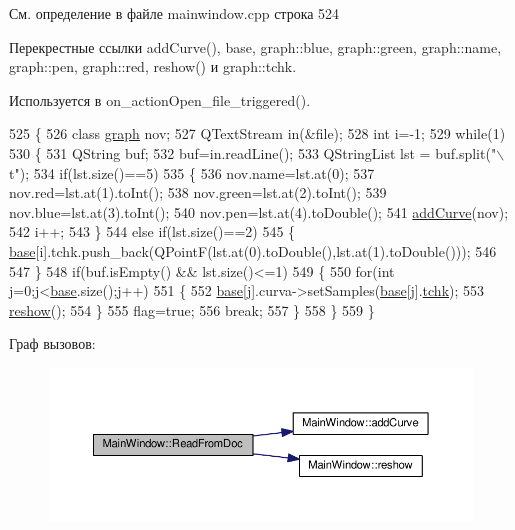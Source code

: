 См. определение в файле mainwindow.\+cpp строка 524



Перекрестные ссылки add\+Curve(), base, graph\+::blue, graph\+::green, graph\+::name, graph\+::pen, graph\+::red, reshow() и graph\+::tchk.



Используется в on\+\_\+action\+Open\+\_\+file\+\_\+triggered().


\begin{DoxyCode}
525 \{
526     \textcolor{keyword}{class }\hyperlink{classgraph}{graph} nov;
527     QTextStream in(&file);
528     \textcolor{keywordtype}{int} i=-1;
529     \textcolor{keywordflow}{while}(1)
530     \{
531         QString buf;
532         buf=in.readLine();
533         QStringList lst = buf.split(\textcolor{stringliteral}{"\(\backslash\)t"});
534         \textcolor{keywordflow}{if}(lst.size()==5)
535         \{
536             nov.name=lst.at(0);
537             nov.red=lst.at(1).toInt();
538             nov.green=lst.at(2).toInt();
539             nov.blue=lst.at(3).toInt();
540             nov.pen=lst.at(4).toDouble();
541             \hyperlink{class_main_window_aa5c0998b1192bfab3ff83b02c42b2c67}{addCurve}(nov);
542             i++;
543         \}
544         \textcolor{keywordflow}{else} \textcolor{keywordflow}{if}(lst.size()==2)
545         \{   \hyperlink{class_main_window_a3413d4508f4981518b1b8ebf3b29121e}{base}[i].tchk.push\_back(QPointF(lst.at(0).toDouble(),lst.at(1).toDouble()));
546 
547         \}
548         \textcolor{keywordflow}{if}(buf.isEmpty() && lst.size()<=1)
549         \{
550             \textcolor{keywordflow}{for}(\textcolor{keywordtype}{int} j=0;j<\hyperlink{class_main_window_a3413d4508f4981518b1b8ebf3b29121e}{base}.size();j++)
551             \{
552                 \hyperlink{class_main_window_a3413d4508f4981518b1b8ebf3b29121e}{base}[j].curva->setSamples(\hyperlink{class_main_window_a3413d4508f4981518b1b8ebf3b29121e}{base}[j].\hyperlink{classgraph_afae7c6852c8de983693fb2fd108ed3c4}{tchk});
553                 \hyperlink{class_main_window_a24985964bdf5f59467dcc99749e06bdd}{reshow}();
554             \}
555             flag=\textcolor{keyword}{true};
556             \textcolor{keywordflow}{break};
557         \}
558     \}
559 \}
\end{DoxyCode}


Граф вызовов\+:\nopagebreak
\begin{figure}[H]
\begin{center}
\leavevmode
\includegraphics[width=350pt]{class_main_window_a219bfb3f9f9946118aaebb0e88f64315_cgraph}
\end{center}
\end{figure}




